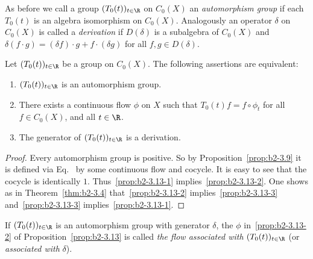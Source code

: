 As before we call a group $(T_{0}(t))_{t \in \R}$ on $C_{0}(X)$ an \emph{automorphism group} if each $T_{0}(t)$ is an algebra isomorphism on $C_{0}(X)$.
Analogously an operator $\delta$ on $C_{0}(X)$ is called a \emph{derivation} if\/ $D(\delta)$ is a subalgebra of\/ $C_{0}(X)$ and $\delta(f \cdot g) = (\delta f) \cdot g + f \cdot (\delta g)$ for all $f,g \in D(\delta)$.

\begin{proposition}\label{prop:b2-3.13}
Let $(T_{0}(t))_{t \in \R}$ be a group on $C_{0}(X)$.
The following assertions are equivalent:
\begin{enumerate}[\upshape (a)]
\item \label{prop:b2-3.13-1}
$(T_{0}(t))_{t \in \R}$ is an automorphism group.
\item \label{prop:b2-3.13-2}
There exists a continuous flow $\phi$ on $X$ such that $T_{0}(t)f = f \circ \phi_{t}$  for all \\
 $f \in C_{0}(X)$, and all $t \in \R$.
\item \label{prop:b2-3.13-3} 
The generator of\/ $(T_{0}(t))_{t \in \R}$ is a derivation.
\end{enumerate}
\end{proposition}
\begin{proof}
Every automorphism group is positive.
So by Proposition~\ref{prop:b2-3.9}  it is defined via Eq.~ by some continuous flow and cocycle.
It is easy to see that the cocycle is identically $1$.
Thus~\ref{prop:b2-3.13-1} implies~\ref{prop:b2-3.13-2}.
One shows as in Theorem~\ref{thm:b2-3.4}  that~\ref{prop:b2-3.13-2} implies~\ref{prop:b2-3.13-3} and~\ref{prop:b2-3.13-3} implies~\ref{prop:b2-3.13-1}.
\end{proof}

If\/ $(T_{0}(t))_{t \in \R}$ is an automorphism group with generator $\delta$, the $\phi$ in~\ref{prop:b2-3.13-2} of Proposition~\ref{prop:b2-3.13} is called \emph{the flow associated with} $(T_{0}(t))_{t \in \R}$ (or \emph{associated with} $\delta$).

